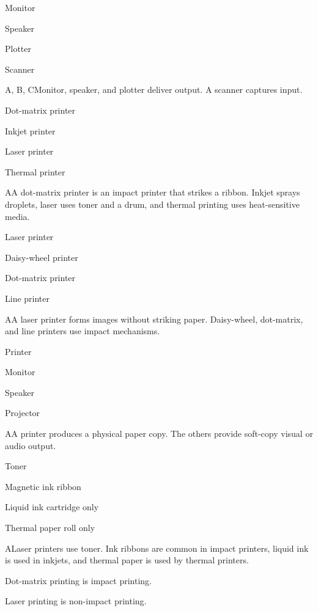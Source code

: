 \begin{enumerate}[label=\textbf{Q\arabic*.}, leftmargin=*]
  {\item Monitor
   \item Speaker
   \item Plotter
   \item Scanner}
  {A, B, C}{Monitor, speaker, and plotter deliver output. A scanner captures input.}
\fi
\ifnum{}
  {\item Dot-matrix printer
   \item Inkjet printer
   \item Laser printer
   \item Thermal printer}
  {A}{A dot-matrix printer is an impact printer that strikes a ribbon. Inkjet sprays droplets, laser uses toner and a drum, and thermal printing uses heat-sensitive media.}
  {\item Laser printer
   \item Daisy-wheel printer
   \item Dot-matrix printer
   \item Line printer}
  {A}{A laser printer forms images without striking paper. Daisy-wheel, dot-matrix, and line printers use impact mechanisms.}
  {\item Printer
   \item Monitor
   \item Speaker
   \item Projector}
  {A}{A printer produces a physical paper copy. The others provide soft-copy visual or audio output.}
  {\item Toner
   \item Magnetic ink ribbon
   \item Liquid ink cartridge only
   \item Thermal paper roll only}
  {A}{Laser printers use toner. Ink ribbons are common in impact printers, liquid ink is used in inkjets, and thermal paper is used by thermal printers.}
  {\item Dot-matrix printing is impact printing.
   \item Laser printing is non-impact printing.
}
\end{enumerate}
